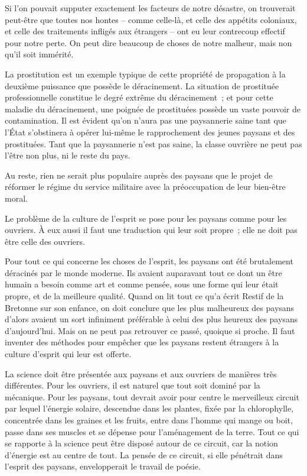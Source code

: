 \documentclass[french,twoside]{book} %
\begin{document}
Si l'on pouvait supputer exactement les facteurs de notre désastre, on trouverait peut-être que toutes nos hontes – comme celle-là, et celle des appétits coloniaux, et celle des traitements infligés aux étrangers – ont eu leur contrecoup effectif pour notre perte. On peut dire beaucoup de choses de notre malheur, mais non qu'il soit immérité.\par
La prostitution est un exemple typique de cette propriété de propagation à la deuxième puissance que possède le déracinement. La situation de prostituée professionnelle constitue le degré extrême du déracinement ; et pour cette maladie du déracinement, une poignée de prostituées possède un vaste pouvoir de contamination. Il est évident qu'on n'aura pas une paysannerie saine tant que l'État s'obstinera à opérer lui-même le rapprochement des jeunes paysans et des prostituées. Tant que la paysannerie n'est pas saine, la classe ouvrière ne peut pas l'être non plus, ni le reste du pays.\par
Au reste, rien ne serait plus populaire auprès des paysans que le projet de réformer le régime du service militaire avec la préoccupation de leur bien-être moral.\par
Le problème de la culture de l'esprit se pose pour les paysans comme pour les ouvriers. À eux aussi il faut une traduction qui leur soit propre ; elle ne doit pas être celle des ouvriers.\par
Pour tout ce qui concerne les choses de l'esprit, les paysans ont été brutalement déracinés par le monde moderne. Ils avaient auparavant tout ce dont un être humain a besoin comme art et comme pensée, sous une forme qui leur était propre, et de la meilleure qualité. Quand on lit tout ce qu'a écrit Restif de la Bretonne sur son enfance, on doit conclure que les plus malheureux des paysans d'alors avaient un sort infiniment préférable à celui des plus heureux des paysans d'aujourd'hui. Mais on ne peut pas retrouver ce passé, quoique si proche. Il faut inventer des méthodes pour empêcher que les paysans restent étrangers à la culture d'esprit qui leur est offerte.\par
La science doit être présentée aux paysans et aux ouvriers de manières très différentes. Pour les ouvriers, il est naturel que tout soit dominé par la mécanique. Pour les paysans, tout devrait avoir pour centre le merveilleux circuit par lequel l'énergie solaire, descendue dans les plantes, fixée par la chlorophylle, concentrée dans les graines et les fruits, entre dans l'homme qui mange ou boit, passe dans ses muscles et se dépense pour l'aménagement de la terre. Tout ce qui se rapporte à la science peut être disposé autour de ce circuit, car la notion d'énergie est au centre de tout. La pensée de ce circuit, si elle pénétrait dans l'esprit des paysans, envelopperait le travail de poésie.\par
\end{document}

